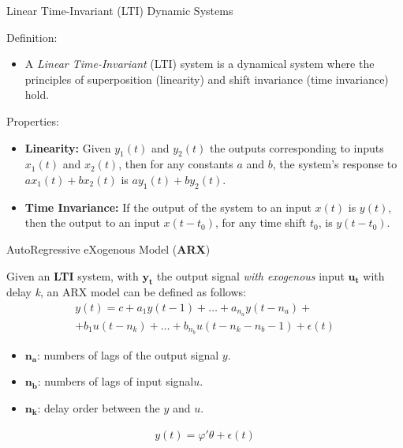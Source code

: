 \documentclass[aspectratio=169,hyperref={pdfpagelabels=false}]{beamer}
\begin{document}
\begin{frame}{Linear Time-Invariant (LTI) Dynamic Systems}
  \begin{block}{Definition:}
    \begin{itemize}
      \item[] A \textit{Linear Time-Invariant} (LTI) system is a dynamical system where the principles of superposition (linearity) and shift invariance (time invariance) hold.
    \end{itemize}
  \end{block}\pause

\begin{block}{Properties:}
  \begin{itemize}
    \item \textbf{Linearity:} Given $y_1(t)$ and $y_2(t)$ the outputs corresponding to inputs $x_1(t)$ and $x_2(t)$, then for any constants $a$ and $b$, the system's response to $ax_1(t) + bx_2(t)$ is $ay_1(t) + by_2(t)$.
    \item \textbf{Time Invariance:} If the output of the system to an input $x(t)$ is $y(t)$, then the output to an input $x(t - t_0)$, for any time shift $t_0$, is $y(t - t_0)$.
  \end{itemize}
\end{block}
\end{frame}

\begin{frame}{AutoRegressive eXogenous Model (\textbf{ARX})}
  \begin{block}{}
    Given an \textbf{LTI} system, with $\bm{y_t}$ the output signal \textit{with exogenous} input $\bm{u_t}$ with delay \textit{k}, an ARX model can be defined as follows:
    \begin{align*}
      y(t) = c + a_{1}y(t-1) + \dots + a_{n_a}y(t-n_a) + \\ 
              + b_{1}u(t-n_k) + \dots + b_{n_b}u(t-n_k-n_b-1) + \epsilon(t)      
    \end{align*}
    \begin{itemize}
      \item $\bm{n_a}$: numbers of lags of the output signal $y$.
      \item $\bm{n_b}$: numbers of lags of input signal$u$.
      \item $\bm{n_k}$: delay order between the $y$ and $u$.
    \end{itemize}
     
    \begin{align*}
      \boxed{y(t) = \varphi'\theta + \epsilon(t)}
    \end{align*}
  \end{block}
  \end{frame}
\end{document}
